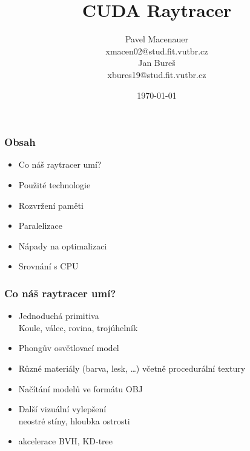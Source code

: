 \documentclass{beamer}
\title{\textbf{CUDA Raytracer}}
\author{
	\large{Pavel Macenauer} \\ 
	\tiny{xmacen02@stud.fit.vutbr.cz} \\ 
	\large{Jan Bureš} \\ 
	\tiny{xbures19@stud.fit.vutbr.cz}
}
\date{\tiny{\today}}
\institute[FIT VUTBR]
{
	\inst{}
	Fakulta Informačních Technologií \\
	Vysoké Učení Technické v Brně
}
\begin{document}
	\begin{frame}[t,plain]
	\titlepage
	\tableofcontents[currentsection]
	\vspace{-10mm}
	\end{frame}


	\begin{frame}[t,fragile]
		\frametitle{Obsah}	
		
		\begin{itemize}
			\item Co náš raytracer umí?
			\item Použité technologie
			\item Rozvržení paměti
			\item Paralelizace
			\item Nápady na optimalizaci
			\item Srovnání s CPU			
		\end{itemize}			
				
	\end{frame}
	

	
	
	\begin{frame}[t,fragile]
		\frametitle{Co náš raytracer umí?}
		
		\begin{itemize}
			\item Jednoduchá primitiva \\
				\footnotesize{Koule, válec, rovina, trojúhelník}
			\item Phongův osvětlovací model
			\item Různé materiály (barva, lesk, \dots) včetně procedurální textury
			\item Načítání modelů ve formátu OBJ			
			\item Další vizuální vylepšení \\
			   \footnotesize{neostré stíny, hloubka ostrosti}			   
			\item akcelerace BVH, KD-tree
		\end{itemize}		
		
	\end{frame}


\end{document}
